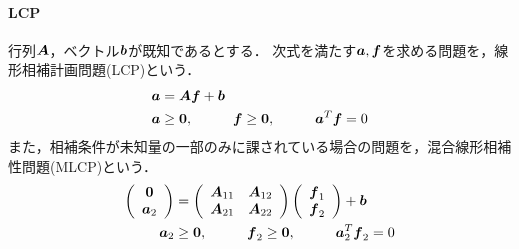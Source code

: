 \documentclass{jsarticle}
\begin{document}
\paragraph{LCP}
行列$\mbox{\boldmath $A$}$，ベクトル$\mbox{\boldmath $b$}$が既知であるとする．
次式を満たす$\mbox{\boldmath $a$},\mbox{\boldmath $f$}$を求める問題を，線形相補計画問題(LCP)という．
\begin{align*}
\va &= \vA \vf + \vb\\
\va &\ge\0,
\hspace{10mm}\vf \ge\0,
\hspace{10mm}\va^T\vf=0\notag
\end{align*}
また，相補条件が未知量の一部のみに課されている場合の問題を，混合線形相補性問題(MLCP)という．
\begin{align*}
   \left(
    \begin{array}{c}
       \0\\
       \va_2
    \end{array}
   \right)
&=
   \left(
    \begin{array}{cc}
       \vA_{11}   & \vA_{12}\\
       \vA_{21}   & \vA_{22}
    \end{array}
   \right)
   \left(
    \begin{array}{c}
       \vf_1\\
       \vf_2
    \end{array}
   \right)
+\vb\\
\va_2 &\ge\0,
\hspace{10mm}\vf_2 \ge\0,
\hspace{10mm}\va_2^T\vf_2=0\notag
\end{align*}
\end{document}
